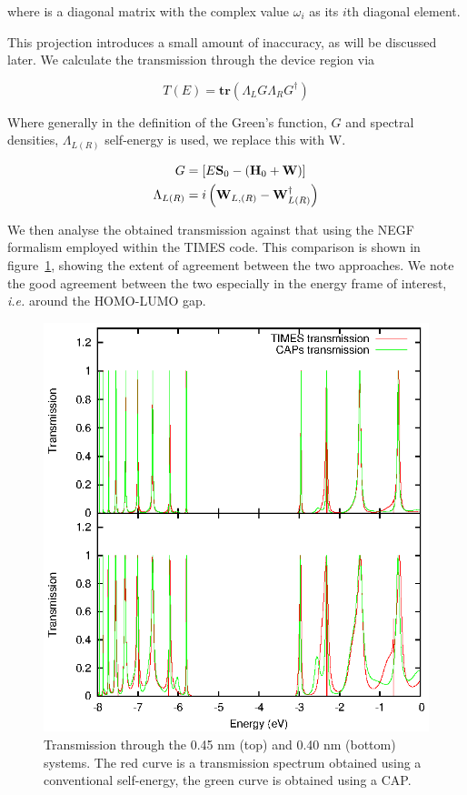 where \umm{\omega} is a diagonal matrix with the complex value $\omega_i$ as
its $i$th diagonal element.

This projection introduces a small amount of inaccuracy, as will be discussed
later. We calculate the transmission through the device region via

\begin{equation}
	T(E) = \mathbf{tr}(\Lambda_L G \Lambda_R G^\dagger)	
	\label{eq:transmission}
\end{equation}

Where generally in the definition of the Green's function, $G$ and spectral
densities, $\Lambda_{L(R)}$ self-energy is used, we replace this with W.

\begin{subequations}
\begin{align}
	G &= [E\mathbf{S}_0 - (\mathbf{H}_0 + \mathbf{W})] \\
	\Lambda_{L(R)} &= i \left( \mathbf{W}_{L,(R)}
	                  - \mathbf{W}^\dagger_{L(R)} \right)
\end{align}
\label{eq:glambdadef}
\end{subequations}

We then analyse the obtained transmission against that using the NEGF formalism
employed within the TIMES code. This comparison is shown in
figure~\ref{fig:transdat}, showing the extent of agreement between the two
approaches. We note the good agreement between the two especially in the energy
frame of interest, \textit{i.e.} around the \ac{HOMO}-\ac{LUMO} gap.

\begin{figure} 
	\begin{center}
		\includegraphics[width=0.9\linewidth]{figures/transdat.eps}
	\end{center}
	\caption{Transmission through the 0.45 nm (top) and 0.40 nm (bottom)
	         systems. The red curve is a transmission spectrum obtained
		 using a conventional self-energy, the green curve is obtained
		 using a \ac{CAP}.}
	\label{fig:transdat}
\end{figure}

